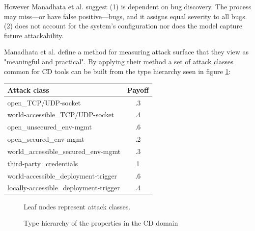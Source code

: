 However Manadhata et al.\cite{as} suggest (1) is dependent on bug discovery. The process may miss---or have false positive---bugs, and it assigns equal severity to all bugs. (2) does not account for the system's configuration nor does the model capture future attackability.

Manadhata et al. define\cite{as} a method for measuring attack surface that they view as "meaningful and practical". By applying their method a set of attack classes common for CD tools can be built from the type hierarchy seen in figure \ref{fig:th}:

\begin{tabularx}{\textwidth}{| X | c |}
    \hline
    \textbf{Attack class}                  & \textbf{Payoff}\\ \hline \hline
    open\_TCP/UDP-socket                   & .3\\ \hline
    world-accessible\_TCP/UDP-socket       & .4\\ \hline
    open\_unsecured\_env-mgmt              & .6\\ \hline
    open\_secured\_env-mgmt                & .2\\ \hline
    world\_accessible\_secured\_env-mgmt   & .3\\ \hline
    third-party\_credentials               & 1\\ \hline
    world-accessible\_deployment-trigger   & .6\\ \hline
    locally-accessible\_deployment-trigger & .4\\ \hline
\end{tabularx}


\begin{figure}[h]
\caption{Type hierarchy of the properties in the CD domain}
\medskip
\small
\centering 
Leaf nodes represent attack classes.
\label{fig:th}
\end{figure}

